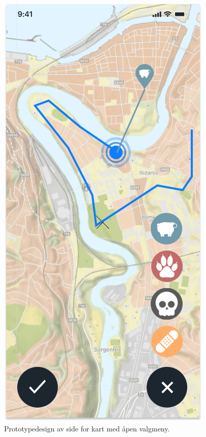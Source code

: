 \begin{figure}[H]
\centering
\captionsetup{width=.8\linewidth}
\includegraphics[scale=0.4]{Figurer/Figma/Frame 2.1 - Oppsynstur-kart-apen-meny.png}
\caption{Prototypedesign av side for kart med åpen valgmeny.}
\label{fig:figma-kart-apen-meny}
\end{figure}

